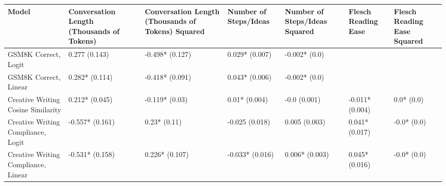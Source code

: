 \begin{tabular}{x{1.5cm}|x{0.75cm}|x{0.75cm}|x{0.75cm}|x{0.75cm}|x{0.75cm}|x{0.75cm}}
\toprule
\hline
Model & Conversation Length (Thousands of Tokens) & Conversation Length (Thousands of Tokens) Squared & Number of Steps/Ideas & Number of Steps/Ideas Squared & Flesch Reading Ease & Flesch Reading Ease Squared \\
\hline
\midrule
GSM8K Correct, Logit & 0.277 (0.143) & -0.498* (0.127) & 0.029* (0.007) & -0.002* (0.0) &  &  \\
\hline
GSM8K Correct, Linear & 0.282* (0.114) & -0.418* (0.091) & 0.043* (0.006) & -0.002* (0.0) &  &  \\
\hline
Creative Writing Cosine Similarity & 0.212* (0.045) & -0.119* (0.03) & 0.01* (0.004) & -0.0 (0.001) & -0.011* (0.004) & 0.0* (0.0) \\
\hline
Creative Writing Compliance, Logit & -0.557* (0.161) & 0.23* (0.11) & -0.025 (0.018) & 0.005 (0.003) & 0.041* (0.017) & -0.0* (0.0) \\
\hline
Creative Writing Compliance, Linear & -0.531* (0.158) & 0.226* (0.107) & -0.033* (0.016) & 0.006* (0.003) & 0.045* (0.016) & -0.0* (0.0) \\
\hline
\bottomrule
\end{tabular}
